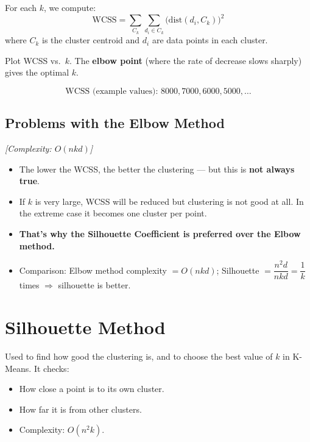 \documentclass[12pt,a4paper]{article}
\begin{document}
\begin{definitionbox}
For each $k$, we compute:
\[
\text{WCSS} = \sum_{C_k} \sum_{d_i \in C_k} \bigl(\text{dist}(d_i, C_k)\bigr)^2
\]
where $C_k$ is the cluster centroid and $d_i$ are data points in each cluster.
\end{definitionbox}

Plot WCSS vs.\ $k$. The \textbf{elbow point} (where the rate of decrease slows sharply) gives the optimal $k$.

\[
\text{WCSS (example values): } 8000, 7000, 6000, 5000, \ldots
\]

\subsection{Problems with the Elbow Method} \quad \textit{[Complexity: $O(nkd)$]}

\begin{itemize}
  \item The lower the WCSS, the better the clustering --- but this is \textbf{not always true}.
  \item If $k$ is very large, WCSS will be reduced but clustering is not good at all. In the extreme case it becomes one cluster per point.
  \item \textbf{That's why the Silhouette Coefficient is preferred over the Elbow method.}
  \item Comparison: Elbow method complexity $= O(nkd)$; Silhouette $= \dfrac{n^2d}{nkd} = \dfrac{1}{k}$ times $\Rightarrow$ silhouette is better.
\end{itemize}

\section{Silhouette Method}

\begin{definitionbox}
Used to find how good the clustering is, and to choose the best value of $k$ in K-Means. It checks:
\begin{itemize}
  \item How close a point is to its own cluster.
  \item How far it is from other clusters.
  \item Complexity: $O(n^2 k)$.
\end{itemize}
\end{definitionbox}
\end{document}
